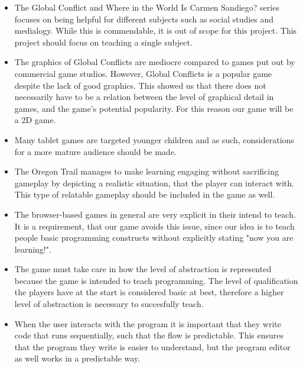 \begin{itemize}
	\item The Global Conflict and Where in the World Is Carmen Sandiego? series focuses on being helpful for different subjects such as social studies 		
	and medialogy. While this is commendable, it is out of scope for this project. This project should focus on teaching a single subject.
	
	\item The graphics of Global Conflicts are mediocre compared to games put out by commercial game studios. However, Global Conflicts is a popular game 
	despite the lack of good graphics. This showed us that there does not necessarily have to be a relation between the level of graphical detail in 
	games, and the game's potential popularity. For this reason our game will be a 2D game.
	
	\item Many tablet games are targeted younger children and as such, considerations for a more mature audience should be made.

	\item The Oregon Trail manages to make learning engaging without sacrificing gameplay by depicting a realistic situation, that the player can 
	interact with. This type of relatable gameplay should be included in the game as well.

	\item The browser-based games in general are very explicit in their intend to teach. It is a requirement, that our game avoids this issue, 
	since our idea is to teach people basic programming constructs without explicitly stating "now you are learning!". 
	
	\item The game must take care in how the level of abstraction is represented because the game is intended to teach programming. The level of 	
	qualification the players have at the start is considered basic at best, therefore a higher level of abstraction is necessary to succesfully teach.
	
	\item When the user interacts with the program it is important that they write code that runs sequentially, such that the flow is predictable. This 
	ensures that the program they write is easier to understand, but the program editor as well works in a predictable way.
\end{itemize}

